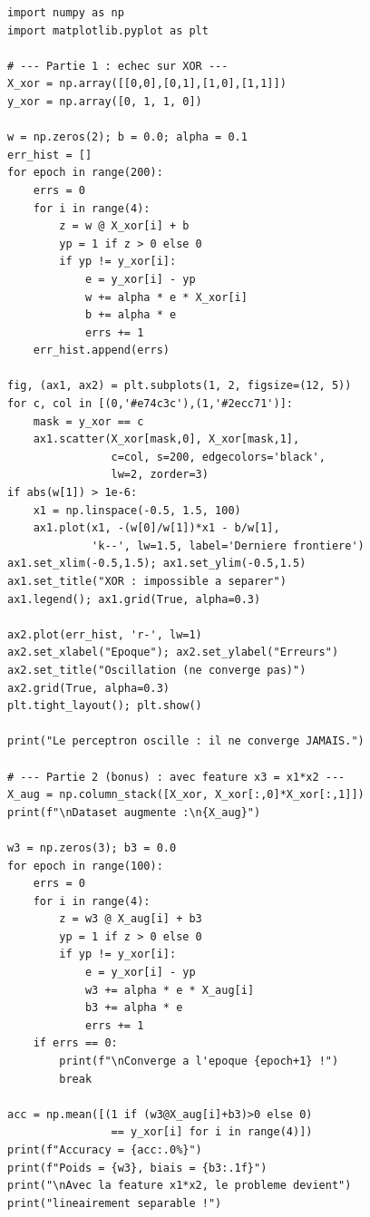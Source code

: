 \begin{pythonbox}
\begin{lstlisting}
import numpy as np
import matplotlib.pyplot as plt

# --- Partie 1 : echec sur XOR ---
X_xor = np.array([[0,0],[0,1],[1,0],[1,1]])
y_xor = np.array([0, 1, 1, 0])

w = np.zeros(2); b = 0.0; alpha = 0.1
err_hist = []
for epoch in range(200):
    errs = 0
    for i in range(4):
        z = w @ X_xor[i] + b
        yp = 1 if z > 0 else 0
        if yp != y_xor[i]:
            e = y_xor[i] - yp
            w += alpha * e * X_xor[i]
            b += alpha * e
            errs += 1
    err_hist.append(errs)

fig, (ax1, ax2) = plt.subplots(1, 2, figsize=(12, 5))
for c, col in [(0,'#e74c3c'),(1,'#2ecc71')]:
    mask = y_xor == c
    ax1.scatter(X_xor[mask,0], X_xor[mask,1],
                c=col, s=200, edgecolors='black',
                lw=2, zorder=3)
if abs(w[1]) > 1e-6:
    x1 = np.linspace(-0.5, 1.5, 100)
    ax1.plot(x1, -(w[0]/w[1])*x1 - b/w[1],
             'k--', lw=1.5, label='Derniere frontiere')
ax1.set_xlim(-0.5,1.5); ax1.set_ylim(-0.5,1.5)
ax1.set_title("XOR : impossible a separer")
ax1.legend(); ax1.grid(True, alpha=0.3)

ax2.plot(err_hist, 'r-', lw=1)
ax2.set_xlabel("Epoque"); ax2.set_ylabel("Erreurs")
ax2.set_title("Oscillation (ne converge pas)")
ax2.grid(True, alpha=0.3)
plt.tight_layout(); plt.show()

print("Le perceptron oscille : il ne converge JAMAIS.")

# --- Partie 2 (bonus) : avec feature x3 = x1*x2 ---
X_aug = np.column_stack([X_xor, X_xor[:,0]*X_xor[:,1]])
print(f"\nDataset augmente :\n{X_aug}")

w3 = np.zeros(3); b3 = 0.0
for epoch in range(100):
    errs = 0
    for i in range(4):
        z = w3 @ X_aug[i] + b3
        yp = 1 if z > 0 else 0
        if yp != y_xor[i]:
            e = y_xor[i] - yp
            w3 += alpha * e * X_aug[i]
            b3 += alpha * e
            errs += 1
    if errs == 0:
        print(f"\nConverge a l'epoque {epoch+1} !")
        break

acc = np.mean([(1 if (w3@X_aug[i]+b3)>0 else 0)
                == y_xor[i] for i in range(4)])
print(f"Accuracy = {acc:.0%}")
print(f"Poids = {w3}, biais = {b3:.1f}")
print("\nAvec la feature x1*x2, le probleme devient")
print("lineairement separable !")
\end{lstlisting}
\end{pythonbox}

